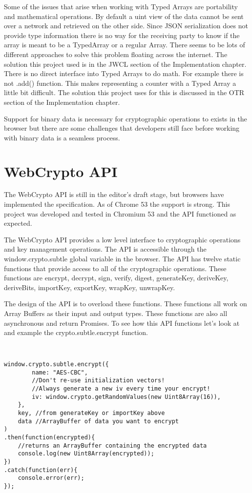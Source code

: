 Some of the issues that arise when working with Typed Arrays are portability and mathematical operations. By default a uint view of the data cannot be sent over a network and retrieved on the other side. Since JSON serialization does not provide type information there is no way for the receiving party to know if the array is meant to be a TypedArray or a regular Array. There seems to be lots of different approaches to solve this problem floating across the internet. The solution this project used is in the JWCL section of the Implementation chapter. There is no direct interface into Typed Arrays to do math. For example there is not .add() function. This makes representing a counter with a Typed Array a little bit difficult. The solution this project uses for this is discussed in the OTR section of the Implementation chapter.


Support for binary data is necessary for cryptographic operations to exists in the browser but there are some challenges that developers still face before working with binary data is a seamless process.


\section{WebCrypto API}


The WebCrypto API is still in the editor's draft stage, but browsers have implemented the specification. As of Chrome 53 the support is strong. This project was developed and tested in Chromium 53 and the API functioned as expected. \cite{webcrypto-overview} \cite{webcrypto-chromium}


The WebCrypto API provides a low level interface to cryptographic operations and key management operations. The API is accessible through the window.crypto.subtle global variable in the browser. The API has twelve static functions that provide access to all of the cryptographic operations. These functions are encrypt, decrypt, sign, verify, digest, generateKey, deriveKey, deriveBits, importKey, exportKey, wrapKey, unwrapKey.


The design of the API is to overload these functions. These functions all work on Array Buffers as their input and output types. These functions are also all asynchronous and return Promises. To see how this API functions let's look at and example the crypto.subtle.encrypt function.


\begin{lstlisting}


window.crypto.subtle.encrypt({
        name: "AES-CBC",
        //Don't re-use initialization vectors!
        //Always generate a new iv every time your encrypt!
        iv: window.crypto.getRandomValues(new Uint8Array(16)),
    },
    key, //from generateKey or importKey above
    data //ArrayBuffer of data you want to encrypt
)
.then(function(encrypted){
    //returns an ArrayBuffer containing the encrypted data
    console.log(new Uint8Array(encrypted));
})
.catch(function(err){
    console.error(err);
});


\end{lstlisting}



